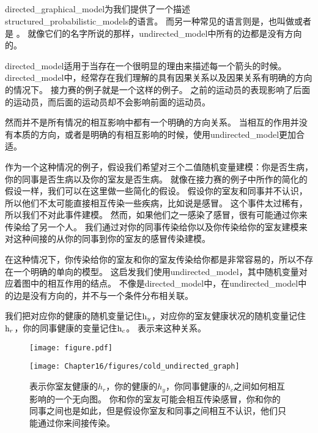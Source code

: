 \subsection{}
\label{sec:undirected_models}


\gls{directed_graphical_model}为我们提供了一个描述\gls{structured_probabilistic_models}的语言。
而另一种常见的语言则是，也叫做或者是 \citep{kindermann-book-1980}。
就像它们的名字所说的那样，\gls{undirected_model}中所有的边都是没有方向的。


\gls{directed_model}适用于当存在一个很明显的理由来描述每一个箭头的时候。
\gls{directed_model}中，经常存在我们理解的具有因果关系以及因果关系有明确的方向的情况下。
接力赛的例子就是一个这样的例子。
之前的运动员的表现影响了后面的运动员，而后面的运动员却不会影响前面的运动员。


然而并不是所有情况的相互影响中都有一个明确的方向关系。
当相互的作用并没有本质的方向，或者是明确的有相互影响的时候，使用\gls{undirected_model}更加合适。


作为一个这种情况的例子，假设我们希望对三个二值随机变量建模：你是否生病，你的同事是否生病以及你的室友是否生病。
就像在接力赛的例子中所作的简化的假设一样，我们可以在这里做一些简化的假设。
假设你的室友和同事并不认识，所以他们不太可能直接相互传染一些疾病，比如说是感冒。
这个事件太过稀有，所以我们不对此事件建模。
然而，如果他们之一感染了感冒，很有可能通过你来传染给了另一个人。
我们通过对你的同事传染给你以及你传染给你的室友建模来对这种间接的从你的同事到你的室友的感冒传染建模。


在这种情况下，你传染给你的室友和你的室友传染给你都是非常容易的，所以不存在一个明确的单向的模型。
这启发我们使用\gls{undirected_model}，其中随机变量对应着图中的相互作用的结点。
不像是\gls{directed_model}中，在\gls{undirected_model}中的边是没有方向的，并不与一个条件分布相关联。


我们把对应你的健康的随机变量记住$\mathrm{h}_y$，对应你的室友健康状况的随机变量记住$\mathrm{h}_r$，你的同事健康的变量记住$\mathrm{h}_c$。
表示来这种关系。

\begin{figure}[!htb]
\ifOpenSource
\centerline{\texttt{[image: figure.pdf]}}
\else
	\centerline{\texttt{[image: Chapter16/figures/cold\_undirected\_graph]}}	
\fi
	\caption{表示你室友健康的$h_r$，你的健康的$h_y$，你同事健康的$h_c$之间如何相互影响的一个无向图。
		你和你的室友可能会相互传染感冒，你和你的同事之间也是如此，但是假设你室友和同事之间相互不认识，他们只能通过你来间接传染。}
	\label{fig:cold_undirected_graph}
\end{figure}

